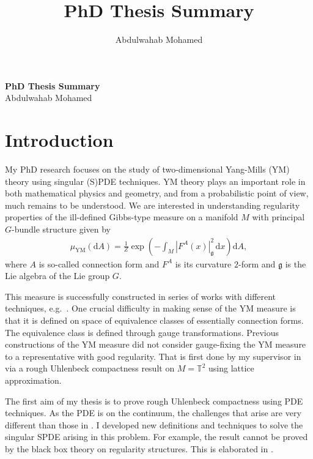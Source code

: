 \documentclass[12pt]{article}
\title{PhD Thesis Summary}
\author{Abdulwahab Mohamed}
\date{}
\numberwithin{equation}{section}
\theoremstyle{definition}
\theoremstyle{remark}
\newcommand{\diff}{\mathrm{d}}
\newcommand{\1}{\mathbf 1}
\newcommand{\<}{\langle}
\renewcommand{\>}{\rangle}
\newcommand{\fg}{\mathfrak g}
\newcommand{\bT}{\mathbb T}
\begin{document}
\vspace{-10pt}
\begin{center}
    {\large \textbf{PhD Thesis Summary}} \\ \vspace{1pt}
    Abdulwahab Mohamed
\end{center}
\section{Introduction}
My PhD research focuses on the study of two-dimensional Yang-Mills (YM) theory using singular (S)PDE techniques. YM theory plays an important role in both mathematical physics and geometry, and from a probabilistic point of view, much remains to be understood. We are interested in understanding regularity properties of the ill-defined Gibbs-type measure on a manifold $M$ with principal $G$-bundle structure given by
\begin{align}\label{eq:YM_measure}
\mu_{\mathrm{YM}}(\diff A)=\frac 1 Z\exp\left(-\int_{M}|F^A(x)|_{\mathfrak g}^2\,\diff x\right)\diff A,
\end{align}
where $A$ is so-called connection form and $F^A$ is its curvature $2$-form and $\fg$ is the Lie algebra of the Lie group $G$. 
%

This measure is successfully constructed in series of works with different techniques, e.g.\ \cite{Levy03}. One crucial difficulty in making sense of the YM measure is that it is defined on space of equivalence classes of essentially connection forms. The equivalence class is defined through gauge transformations.   Previous constructions of the YM measure did not consider gauge-fixing the YM measure to a representative with good regularity. That is first done by my supervisor in \cite{Chevyrev19} via a rough Uhlenbeck compactness result on $M=\bT^2$ using lattice approximation.  

The first aim of my thesis is to prove rough Uhlenbeck compactness using PDE techniques. As the PDE is on the continuum, the challenges that arise are very different than those in \cite{Chevyrev19}. I developed new definitions and techniques to solve the singular SPDE arising in this problem. For example, the result cannot be proved by the black box theory on regularity structures. This is elaborated in . 
\end{document}
